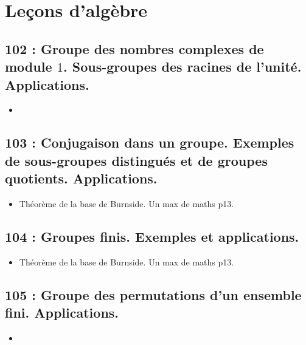 \documentclass[a4paper,10pt,oneside,twocolumn,landscape]{book}
\begin{document}
	\onecolumn  %
	\begin{titlepage}
	\end{titlepage}
	
	\onecolumn  %

\tableofcontents  %

\thispagestyle{empty}



\chapter{Leçons d'algèbre}


\twocolumn  %








\section{102 : Groupe des nombres complexes de module $1$. Sous-groupes des racines de l'unité. Applications.}
\begin{itemize}
	\item
\end{itemize}

\section{103 : Conjugaison dans un groupe. Exemples de sous-groupes distingués et de groupes quotients. Applications.}
\begin{itemize}
	\item Théorème de la base de Burnside. Un max de maths p13.
\end{itemize}


\section{104 : Groupes finis. Exemples et applications.}
\begin{itemize}
	\item Théorème de la base de Burnside. Un max de maths p13.
\end{itemize}


\section{105  : Groupe des permutations d’un ensemble fini. Applications.}
\begin{itemize}
	\item 
\end{itemize}
\end{document}
